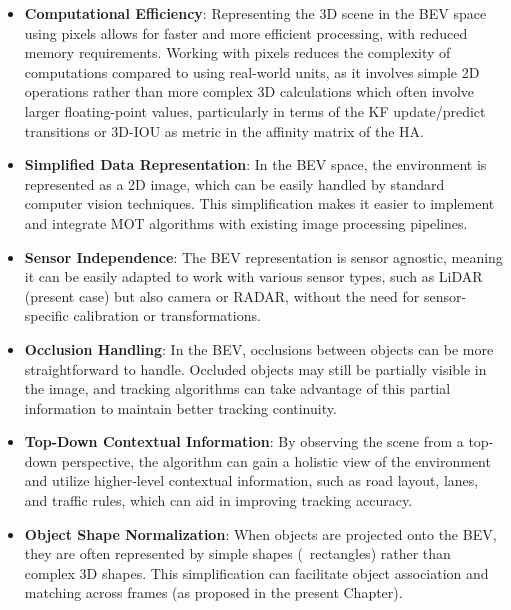 \begin{itemize}
	
	\item \textbf{Computational Efficiency}: Representing the 3D scene in the \ac{BEV} space using pixels allows for faster and more efficient processing, with reduced memory requirements. Working with pixels reduces the complexity of computations compared to using real-world units, as it involves simple 2D operations rather than more complex 3D calculations which often involve larger floating-point values, particularly in terms of the \ac{KF} update/predict transitions or 3D-\ac{IOU} as metric in the affinity matrix of the \acf{HA}.
	
	\item \textbf{Simplified Data Representation}: In the \ac{BEV} space, the environment is represented as a 2D image, which can be easily handled by standard computer vision techniques. This simplification makes it easier to implement and integrate \ac{MOT} algorithms with existing image processing pipelines.

	\item \textbf{Sensor Independence}: The \ac{BEV} representation is sensor agnostic, meaning it can be easily adapted to work with various sensor types, such as \ac{LiDAR} (present case) but also camera or \ac{RADAR}, without the need for sensor-specific calibration or transformations.
	
	\item \textbf{Occlusion Handling}: In the \ac{BEV}, occlusions between objects can be more straightforward to handle. Occluded objects may still be partially visible in the image, and tracking algorithms can take advantage of this partial information to maintain better tracking continuity.
	
	\item \textbf{Top-Down Contextual Information}: By observing the scene from a top-down perspective, the algorithm can gain a holistic view of the environment and utilize higher-level contextual information, such as road layout, lanes, and traffic rules, which can aid in improving tracking accuracy.
	
	\item \textbf{Object Shape Normalization}: When objects are projected onto the \ac{BEV}, they are often represented by simple shapes (\eg \ rectangles) rather than complex 3D shapes. This simplification can facilitate object association and matching across frames (as proposed in the present Chapter).

\end{itemize}

